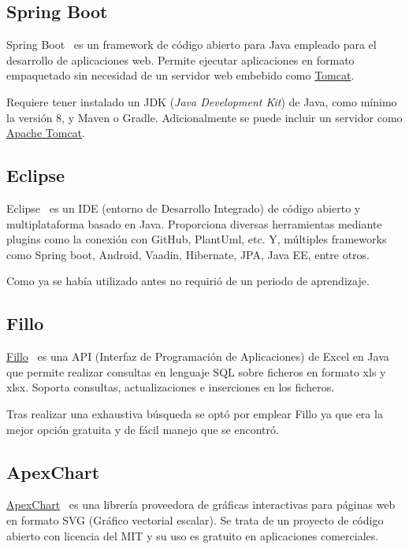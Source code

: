 \subsection{Spring Boot}
Spring Boot~\cite{pagina_springBoot} es un framework de código abierto para Java empleado para el desarrollo de aplicaciones web. Permite ejecutar aplicaciones en formato empaquetado sin necesidad de un servidor web embebido como \href{https://tomcat.apache.org/}{Tomcat}.

Requiere tener instalado un JDK (\textit{Java Development Kit}) de Java, como mínimo la versión 8, y Maven o Gradle. Adicionalmente se puede incluir un servidor como \href{https://tomcat.apache.org/}{Apache Tomcat}.

\subsection{Eclipse}
Eclipse~\cite{pagina_eclipse} es un IDE (entorno de Desarrollo Integrado) de código abierto y multiplataforma basado en Java. Proporciona diversas herramientas mediante plugins como la conexión con GitHub, PlantUml, etc. Y, múltiples frameworks como Spring boot, Android, Vaadin, Hibernate, JPA, Java EE, entre otros.

Como ya se había utilizado antes no requirió de un periodo de aprendizaje.

\subsection{Fillo}
\href{https://codoid.com/fillo/}{Fillo}~\cite{pagina_fillo} es una API (Interfaz de Programación de Aplicaciones) de Excel en Java que permite realizar consultas en lenguaje SQL sobre ficheros en formato xls y xlsx. Soporta consultas, actualizaciones e inserciones en los ficheros. 

Tras realizar una exhaustiva búsqueda se optó por emplear Fillo ya que era la mejor opción gratuita y de fácil manejo que se encontró.

\subsection{ApexChart}
\href{https://apexcharts.com/}{ApexChart}~\cite{pagina_ApexChart} es una librería proveedora de gráficas interactivas para páginas web en formato SVG (Gráfico vectorial escalar).
Se trata de un proyecto de código abierto con licencia del MIT y su uso es gratuito en aplicaciones comerciales.

